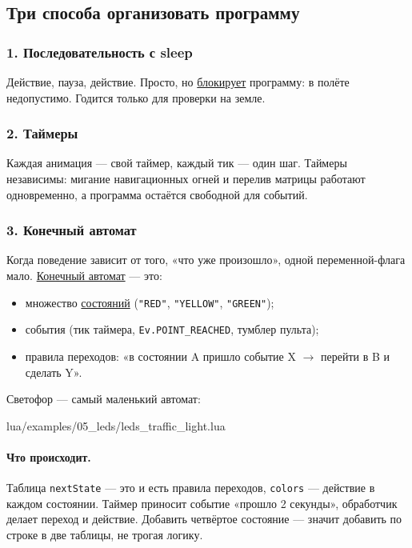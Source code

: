 \subsection{Три способа организовать программу}

\subsubsection{1. Последовательность с sleep}
Действие, пауза, действие. Просто, но \hyperlink{term:blocking}{блокирует} программу: в полёте недопустимо. Годится только для проверки на земле.

\subsubsection{2. Таймеры}
Каждая анимация --- свой таймер, каждый тик --- один шаг. Таймеры независимы: мигание навигационных огней и перелив матрицы работают одновременно, а программа остаётся свободной для событий.

\subsubsection{3. Конечный автомат}
Когда поведение зависит от того, «что уже произошло», одной переменной-флага мало. \hyperlink{term:automaton}{Конечный автомат} --- это:
\begin{itemize}
    \item множество \hyperlink{term:state}{состояний} (\verb|"RED"|, \verb|"YELLOW"|, \verb|"GREEN"|);
    \item события (тик таймера, \verb|Ev.POINT_REACHED|, тумблер пульта);
    \item правила переходов: «в состоянии A пришло событие X $\to$ перейти в B и сделать Y».
\end{itemize}

Светофор --- самый маленький автомат:

\begin{codefile}{lua/examples/05_leds/leds_traffic_light.lua}
\end{codefile}

\paragraph{Что происходит.} Таблица \verb|nextState| --- это и есть правила переходов, \verb|colors| --- действие в каждом состоянии. Таймер приносит событие «прошло 2 секунды», обработчик делает переход и действие. Добавить четвёртое состояние --- значит добавить по строке в две таблицы, не трогая логику.

